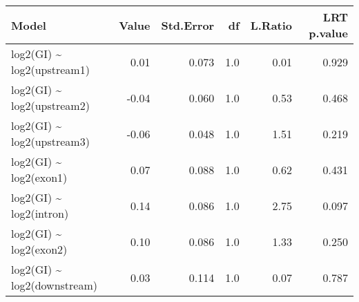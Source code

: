 \begin{table}[ht]
\centering
\begin{tabular}{lrrrrr}
  \hline
Model & Value & Std.Error & df & L.Ratio & LRT p.value \\ 
  \hline
log2(GI) \~{} log2(upstream1) & 0.01 & 0.073 & 1.0 & 0.01 & 0.929 \\ 
  log2(GI) \~{} log2(upstream2) & -0.04 & 0.060 & 1.0 & 0.53 & 0.468 \\ 
  log2(GI) \~{} log2(upstream3) & -0.06 & 0.048 & 1.0 & 1.51 & 0.219 \\ 
  log2(GI) \~{} log2(exon1) & 0.07 & 0.088 & 1.0 & 0.62 & 0.431 \\ 
  log2(GI) \~{} log2(intron) & 0.14 & 0.086 & 1.0 & 2.75 & 0.097 \\ 
  log2(GI) \~{} log2(exon2) & 0.10 & 0.086 & 1.0 & 1.33 & 0.250 \\ 
  log2(GI) \~{} log2(downstream) & 0.03 & 0.114 & 1.0 & 0.07 & 0.787 \\ 
   \hline
\end{tabular}
\end{table}
